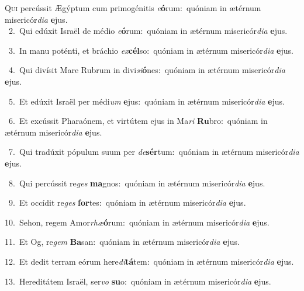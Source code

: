 \lettrine{\initial\textcolor{\initialcolor}{Q}}{ui} percússit Ægýptum cum primogénitis \textit{e}\-\textbf{ó}rum:~\star quóniam in ætérnum misericór\-\textit{di}\-\textit{a} \textbf{e}\-jus.\\
{\numbfont\textcolor{\numbcolor}{~2.}}~Qui edúxit Israël de médio \textit{e}\-\textbf{ó}rum:~\star quóniam in ætérnum misericór\-\textit{di}\-\textit{a} \textbf{e}\-jus.\par
{\numbfont\textcolor{\numbcolor}{~3.}}~In manu poténti, et bráchio \textit{ex}\-\textbf{cél}so:~\star quóniam in ætérnum misericór\-\textit{di}\-\textit{a} \textbf{e}\-jus.\par
{\numbfont\textcolor{\numbcolor}{~4.}}~Qui divísit Mare Rubrum in divi\-\textit{si}\-\textbf{ó}nes:~\star quóniam in ætérnum misericór\-\textit{di}\-\textit{a} \textbf{e}\-jus.\par
{\numbfont\textcolor{\numbcolor}{~5.}}~Et edúxit Israël per médi\textit{um} \textbf{e}\-jus:~\star quóniam in ætérnum misericór\-\textit{di}\-\textit{a} \textbf{e}\-jus.\par
{\numbfont\textcolor{\numbcolor}{~6.}}~Et excússit Pharaónem, et virtútem ejus in Ma\textit{ri} \textbf{Ru}\-bro:~\star quóniam in ætérnum misericór\-\textit{di}\-\textit{a} \textbf{e}\-jus.\par
{\numbfont\textcolor{\numbcolor}{~7.}}~Qui tradúxit pópulum suum per \textit{de}\-\textbf{sér}tum:~\star quóniam in ætérnum misericór\-\textit{di}\-\textit{a} \textbf{e}\-jus.\par
{\numbfont\textcolor{\numbcolor}{~8.}}~Qui percússit re\textit{ges} \textbf{ma}\-gnos:~\star quóniam in ætérnum misericór\-\textit{di}\-\textit{a} \textbf{e}\-jus.\par
{\numbfont\textcolor{\numbcolor}{~9.}}~Et occídit re\textit{ges} \textbf{for}\-tes:~\star quóniam in ætérnum misericór\-\textit{di}\-\textit{a} \textbf{e}\-jus.\par
{\numbfont\textcolor{\numbcolor}{10.}}~Sehon, regem Amor\-\textit{rhæ}\-\textbf{ó}rum:~\star quóniam in ætérnum misericór\-\textit{di}\-\textit{a} \textbf{e}\-jus.\par
{\numbfont\textcolor{\numbcolor}{11.}}~Et Og, re\textit{gem} \textbf{Ba}\-san:~\star quóniam in ætérnum misericór\-\textit{di}\-\textit{a} \textbf{e}\-jus.\par
{\numbfont\textcolor{\numbcolor}{12.}}~Et dedit terram eórum here\-\textit{di}\-\textbf{tá}tem:~\star quóniam in ætérnum misericór\-\textit{di}\-\textit{a} \textbf{e}\-jus.\par
{\numbfont\textcolor{\numbcolor}{13.}}~Hereditátem Israël, ser\textit{vo} \textbf{su}\-o:~\star quóniam in ætérnum misericór\-\textit{di}\-\textit{a} \textbf{e}\-jus.\par
